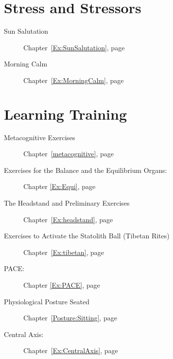 \documentclass[../main.tex]{subfiles}
\begin{document}
%
\section{Stress and Stressors}

\begin{description}
  \item[Sun Salutation] Chapter~\ref{Ex:SunSalutation}, page~\pageref{Ex:SunSalutation}
\item[Morning Calm] Chapter~\ref{Ex:MorningCalm}, page~\pageref{Ex:MorningCalm}
  \end{description}

\section{Learning Training}
\begin{description} 
\item[Metacognitive Exercises] Chapter~\ref{metacognitive}, page~\pageref{metacognitive}
\item[Exercises for the Balance and the Equilibrium Organs:] Chapter \ref{Ex:Equi}, page~\pageref{Ex:Equi}
\item[The Headstand and Preliminary Exercises] Chapter~\ref{Ex:headstand}, page~\pageref{Ex:headstand}
\item[Exercises to Activate the Statolith Ball (Tibetan Rites)] Chapter~\ref{Ex:tibetan}, page~\pageref{Ex:tibetan}
\item[PACE:] Chapter \ref{Ex:PACE}, page \pageref{Ex:PACE}
\item[Physiological Posture Seated] Chapter~\ref{Posture:Sitting}, page~\pageref{Posture:Sitting}
  \item[Central Axis:] Chapter~\ref{Ex:CentralAxis}, page~\pageref{Ex:CentralAxis}
\end{description}
\end{document}
